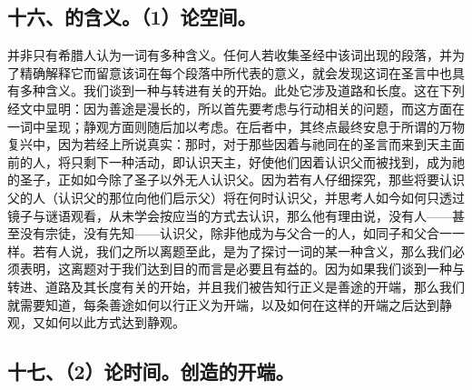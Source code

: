 
\subsection{十六、的含义。（1）论空间。}

 并非只有希腊人认为一词有多种含义。任何人若收集圣经中该词出现的段落，并为了精确解释它而留意该词在每个段落中所代表的意义，就会发现这词在圣言中也具有多种含义。我们谈到一种与转进有关的开始。此处它涉及道路和长度。这在下列经文中显明：因为善途是漫长的，所以首先要考虑与行动相关的问题，而这方面在一词中呈现；静观方面则随后加以考虑。在后者中，其终点最终安息于所谓的万物复兴中，因为若经上所说真实：那时，对于那些因着与祂同在的圣言而来到天主面前的人，将只剩下一种活动，即认识天主，好使他们因着认识父而被找到，成为祂的圣子，正如如今除了圣子以外无人认识父。因为若有人仔细探究，那些将要认识父的人（认识父的那位向他们启示父）将在何时认识父，并思考人如今如何只透过镜子与谜语观看，从未学会按应当的方式去认识，那么他有理由说，没有人——甚至没有宗徒，没有先知——认识父，除非他成为与父合一的人，如同子和父合一一样。若有人说，我们之所以离题至此，是为了探讨一词的某一种含义，那么我们必须表明，这离题对于我们达到目的而言是必要且有益的。因为如果我们谈到一种与转进、道路及其长度有关的开始，并且我们被告知行正义是善途的开端，那么我们就需要知道，每条善途如何以行正义为开端，以及如何在这样的开端之后达到静观，又如何以此方式达到静观。\par


\subsection{十七、（2）论时间。创造的开端。}


